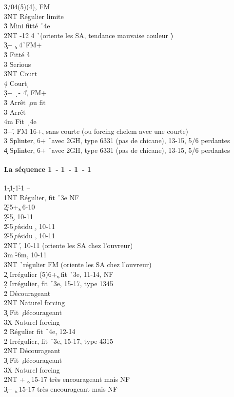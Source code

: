 \documentclass[a4paper]{article}
\begin{document}
\begin{bidtable}
3\s {}/04(5)(4), FM\\
3NT \> Régulier limite\-\\
3\h \> Mini fitté \h\ 4e\-\\
2NT -12 4 \h\ (oriente les SA, tendance mauvaise couleur \h )\\
3\c {}+ \c , 4\h\ FM+\+\\
3\h \> Fitté 4\h \+\\
3\s \> Serious\\
3NT \> Court \s \\
4\d \> Court \d \-\-\\
3\d {}+ \d\ - 4\h , FM+\+\\
3\h \> Arrêt \c\ ou fit \h \\
3\s \> Arrêt \s \\
4m \> Fit \d\ 4e\-\\
3\h {}+\h , FM 16+, sans courte (ou forcing chelem avec une courte)\\
3\s \> Splinter, 6+ \h\ avec 2GH, type 6331 (pas de chicane), 13-15, 5/6 perdantes\\
4\c\d \> Splinter, 6+ \h\ avec 2GH, type 6331 (pas de chicane), 13-15, 5/6 perdantes\-\-
\end{bidtable}

\paragraph{La séquence 1\pdfc\ - 1\pdfd\ - 1\pdfh\ - 1\pdfs}

\begin{bidtable}
1\c-1\d-1\h-1\s \> --\+\\
1NT \> Régulier, fit \h\ 3e NF\+\\
2\c {}\h -5+\c , 6-10\\
2\d {}\h -5\d , 10-11\\
2\h {}\h -5\c\ résidu \d , 10-11\\
2\s {}\h -5\c\ résidu \s , 10-11\\
2NT \h , 10-11 (oriente les SA chez l'ouvreur)\\
3m \h -6m, 10-11\\
3NT \h\ régulier FM (oriente les SA chez l'ouvreur)\-\\
2\c \> Irrégulier (5)6+\c , fit \h\ 3e, 11-14, NF\\
2\d \> Irrégulier, fit \h\ 3e, 15-17, type 1345\+\\
2\h\s \> Décourageant\\
2NT \> Naturel forcing\\
3\c \> Fit \c\ décourageant\\
3X \> Naturel forcing\-\\
2\h \> Régulier fit \h\ 4e, 12-14\\
2\s \> Irrégulier, fit \h\ 3e, 15-17, type 4315\+\\
2NT \> Décourageant\\
3\c \> Fit \c\ décourageant\\
3X \> Naturel forcing\-\\
2NT + \c , 15-17 très encourageant mais NF\\
3\c {}+ \c , 15-17 très encourageant mais NF\-
\end{bidtable}
\end{document}
